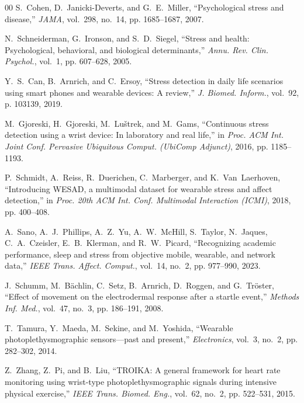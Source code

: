 \documentclass[conference]{IEEEtran}
\begin{document}
\begin{thebibliography}{00}
S.~Cohen, D.~Janicki-Deverts, and G.~E.~Miller, ``Psychological stress and disease,'' \textit{JAMA}, vol.~298, no.~14, pp. 1685--1687, 2007.

N.~Schneiderman, G.~Ironson, and S.~D.~Siegel, ``Stress and health: Psychological, behavioral, and biological determinants,'' \textit{Annu. Rev. Clin. Psychol.}, vol.~1, pp. 607--628, 2005.

Y.~S.~Can, B.~Arnrich, and C.~Ersoy, ``Stress detection in daily life scenarios using smart phones and wearable devices: A review,'' \textit{J. Biomed. Inform.}, vol.~92, p. 103139, 2019.

M.~Gjoreski, H.~Gjoreski, M.~Lu\v{s}trek, and M.~Gams, ``Continuous stress detection using a wrist device: In laboratory and real life,'' in \textit{Proc. ACM Int. Joint Conf. Pervasive Ubiquitous Comput. (UbiComp Adjunct)}, 2016, pp. 1185--1193.

P.~Schmidt, A.~Reiss, R.~Duerichen, C.~Marberger, and K.~Van~Laerhoven, ``Introducing WESAD, a multimodal dataset for wearable stress and affect detection,'' in \textit{Proc. 20th ACM Int. Conf. Multimodal Interaction (ICMI)}, 2018, pp. 400--408.

A.~Sano, A.~J.~Phillips, A.~Z.~Yu, A.~W.~McHill, S.~Taylor, N.~Jaques, C.~A.~Czeisler, E.~B.~Klerman, and R.~W.~Picard, ``Recognizing academic performance, sleep and stress from objective mobile, wearable, and network data,'' \textit{IEEE Trans. Affect. Comput.}, vol.~14, no.~2, pp. 977--990, 2023.

J.~Schumm, M.~B\"achlin, C.~Setz, B.~Arnrich, D.~Roggen, and G.~Tr\"oster, ``Effect of movement on the electrodermal response after a startle event,'' \textit{Methods Inf. Med.}, vol.~47, no.~3, pp. 186--191, 2008.

T.~Tamura, Y.~Maeda, M.~Sekine, and M.~Yoshida, ``Wearable photoplethysmographic sensors---past and present,'' \textit{Electronics}, vol.~3, no.~2, pp. 282--302, 2014.

Z.~Zhang, Z.~Pi, and B.~Liu, ``TROIKA: A general framework for heart rate monitoring using wrist-type photoplethysmographic signals during intensive physical exercise,'' \textit{IEEE Trans. Biomed. Eng.}, vol.~62, no.~2, pp. 522--531, 2015.


\end{thebibliography}
\end{document}
